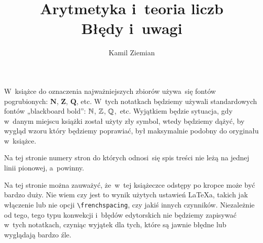 \documentclass[a4paper,11pt]{article}
\title{Arytmetyka i~teoria liczb \\
  {\Large Błędy i~uwagi}}
\author{Kamil Ziemian}
\begin{document}





\maketitle %






\vspace{0em}



\vspace{0em}


\noindent
W~książce do oznaczenia najważniejszych zbiorów używa~się fontów
pogrubionych: $\mathbf{N}$, $\mathbf{Z}$, $\mathbf{Q}$, etc. W~tych
notatkach będziemy używali standardowych fontów „blackboard bold”: $\mathbb{N}$,
$\mathbb{Z}$, $\mathbb{Q}$,~etc. Wyjątkiem będzie sytuacja, gdy w~danym miejscu
książki został użyty zły symbol, wtedy będziemy dążyć, by wygląd wzoru który
będziemy poprawiać, był maksymalnie podobny do oryginału w~książce.

\vspace{\spaceFour}






\vspace{0em}


 Na tej stronie numery stron do których odnosi~się spis treści nie leżą na jednej linii pionowej,
a~powinny.

\vspace{\spaceFour}





 Na tej stronie można zauważyć, że~w~tej książeczce odstępy po kropce
może być bardzo duży. Nie wiem czy jest to wynik użytych ustawień \LaTeX a,
takich jak włączenie lub nie opcji \texttt{\textbackslash frenchspacing},
czy jakiś innych czynników. Niezależnie od tego, tego typu konwekcji
i~błędów edytorskich nie będziemy zapisywać w~tych notatkach, czyniąc
wyjątek dla tych, które są jawnie błędne lub wyglądają bardzo źle.
\end{document}
